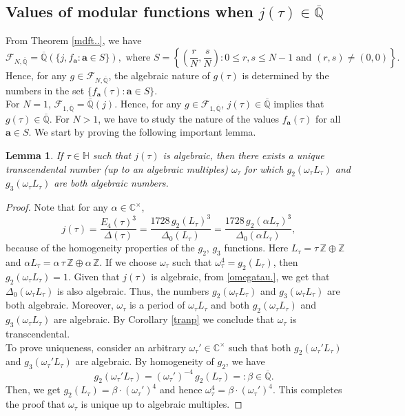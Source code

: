 \documentclass[11pt, reqno]{amsart}
\newtheorem{lemma}[theorem]{Lemma}
\begin{document}
\subsection{Values of modular functions when $j(\tau)\in\overline{\mathbb{Q}}$}
From Theorem \ref{mdft..}, we have $$ \mathcal{F}_{N,\overline{\mathbb{Q}}}=  \overline{\mathbb{Q}}\left(\{j,f_{\boldsymbol{a}} : {\boldsymbol{a}}\in S\}\right), \text{ where }S=\left\{\left(\frac{r}{N},\frac{s}{N}\right): 0\leq r, s\leq N-1 \text{ and }(r,s)\neq (0,0)\right\}.$$
Hence, for any $g\in \mathcal{F}_{N,\overline{\mathbb{Q}}}$, the algebraic nature of $g(\tau)$ is determined by the numbers in the set $\{f_{\boldsymbol{a}}(\tau):{\boldsymbol{a}}\in S\}$.\\

For $N=1$, $\mathcal{F}_{1,\overline{\mathbb{Q}}} = \overline{\mathbb{Q}}(j)$. Hence, for any $g \in \mathcal{F}_{1,\overline{\mathbb{Q}}}$, $j(\tau) \in \overline{\mathbb{Q}}$ implies that $g(\tau) \in \overline{\mathbb{Q}}$. For $N>1$, we have to study the nature of the values $f_{\boldsymbol{a}}(\tau)$ for all ${\boldsymbol{a}}\in S$. We start by proving the following important lemma.
\begin{lemma}\label{omegatau}
 If $\tau\in \mathbb{H}$ such that $j(\tau)$ is algebraic, then there exists a unique transcendental number (up to an algebraic multiples) $\omega_\tau$ for which $g_2(\omega_\tau L_\tau)$ and $g_3(\omega_\tau L_\tau)$ are both algebraic numbers.   
\end{lemma}
\begin{proof}
Note that for any $\alpha \in\mathbb{C}^\times $,
\begin{equation}\label{omegatau.}
    j(\tau)=\frac{E_4(\tau)^3}{\Delta(\tau)}=\frac{1728\,  g_2(L_\tau)^3}{\Delta_0(L_\tau)}=\frac{1728\, g_2\left(\alpha L_\tau\right)^3}{\Delta_0\left(\alpha L_\tau\right)},
\end{equation}
because of the homogeneity properties of the $g_2$, $g_3$ functions. Here $L_\tau=\tau\,\mathbb{Z}\oplus\mathbb{Z}$ and $\alpha L_\tau= \alpha \, \tau\,\mathbb{Z}\oplus\alpha \, \mathbb{Z}$. If we choose $\omega_\tau$ such that $\omega_\tau^4=g_2(L_\tau)$, then $g_2(\omega_\tau L_\tau)=1$. Given that $j(\tau)$ is algebraic, from \eqref{omegatau.}, we get that $\Delta_0(\omega_\tau L_\tau)$ is also algebraic. Thus, the numbers $g_2(\omega_\tau L_\tau)$ and $g_3(\omega_\tau L_\tau)$ are both algebraic. Moreover, $\omega_\tau$ is a period of $\omega_\tau L_\tau$ and both $g_2(\omega_\tau L_\tau)$ and $g_3(\omega_\tau L_\tau)$ are algebraic. By Corollary \ref{tranp} we conclude that $\omega_\tau$ is transcendental.\\

To prove uniqueness, consider an arbitrary $\omega_\tau'\in\mathbb{C}^\times$ such that both $g_2(\omega_\tau' L_\tau)$ and $g_3(\omega_\tau' L_\tau)$ are algebraic. By homogeneity of $g_2$, we have 
$$
 \quad g_2(\omega_\tau' L_\tau)= (\omega_\tau')^{-4}\,g_2(L_\tau)=:\beta \in \overline{\mathbb{Q} }.
$$
Then, we get $g_2(L_\tau)=\beta \cdot (\omega_\tau')^{4}$ and hence $\omega_\tau^4=\beta \cdot (\omega_\tau')^{4}.$
This completes the proof that $\omega_\tau$ is unique up to algebraic multiples.
\end{proof}
\end{document}
